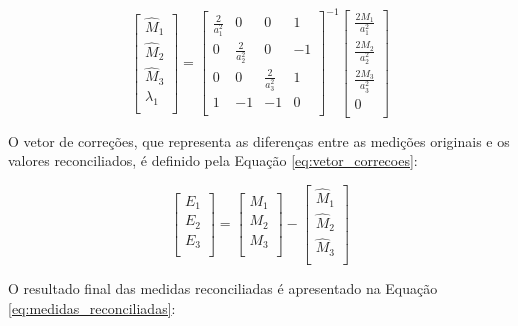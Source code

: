 \begin{equation}
\begin{bmatrix}
    \hat{M}_1 \\
    \hat{M}_2 \\
    \hat{M}_3 \\
    \lambda_1 \\
\end{bmatrix}
=
\begin{bmatrix}
    \frac{2}{a_1^2} & 0 & 0 & 1 \\
    0 & \frac{2}{a_2^2} & 0 & -1 \\
    0 & 0 & \frac{2}{a_3^2} & 1 \\
    1 & -1 & -1 & 0 \\
\end{bmatrix}^{-1}
\begin{bmatrix}
    \frac{2 M_1}{a_1^2} \\
    \frac{2 M_2}{a_2^2} \\
    \frac{2 M_3}{a_3^2} \\
    0 \\
\end{bmatrix}
\label{eq:sistema_resolvido}
\end{equation}

O vetor de correções, que representa as diferenças entre as medições originais e os valores reconciliados, é definido pela Equação \eqref{eq:vetor_correcoes}:

\begin{equation}
\begin{bmatrix}
    E_1 \\
    E_2 \\
    E_3 \\
\end{bmatrix}
=
\begin{bmatrix}
    M_1 \\
    M_2 \\
    M_3 \\
\end{bmatrix}
-
\begin{bmatrix}
    \hat{M}_1 \\
    \hat{M}_2 \\
    \hat{M}_3 \\
\end{bmatrix}
\label{eq:vetor_correcoes}
\end{equation}

O resultado final das medidas reconciliadas é apresentado na Equação \eqref{eq:medidas_reconciliadas}:

